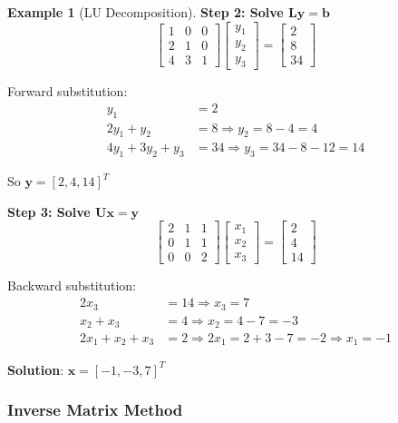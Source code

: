 \documentclass[12pt,a4paper]{article}
\theoremstyle{definition}
\newtheorem{example}{Example}[section]
\begin{document}
\begin{example}[LU Decomposition]
\textbf{Step 2: Solve $\mathbf{Ly} = \mathbf{b}$}
\[
\begin{bmatrix}
1 & 0 & 0 \\
2 & 1 & 0 \\
4 & 3 & 1
\end{bmatrix}
\begin{bmatrix}
y_1 \\ y_2 \\ y_3
\end{bmatrix}
= \begin{bmatrix}
2 \\ 8 \\ 34
\end{bmatrix}
\]

Forward substitution:
\begin{align*}
y_1 &= 2 \\
2y_1 + y_2 &= 8 \Rightarrow y_2 = 8 - 4 = 4 \\
4y_1 + 3y_2 + y_3 &= 34 \Rightarrow y_3 = 34 - 8 - 12 = 14
\end{align*}

So $\mathbf{y} = [2, 4, 14]^T$

\textbf{Step 3: Solve $\mathbf{Ux} = \mathbf{y}$}
\[
\begin{bmatrix}
2 & 1 & 1 \\
0 & 1 & 1 \\
0 & 0 & 2
\end{bmatrix}
\begin{bmatrix}
x_1 \\ x_2 \\ x_3
\end{bmatrix}
= \begin{bmatrix}
2 \\ 4 \\ 14
\end{bmatrix}
\]

Backward substitution:
\begin{align*}
2x_3 &= 14 \Rightarrow x_3 = 7 \\
x_2 + x_3 &= 4 \Rightarrow x_2 = 4 - 7 = -3 \\
2x_1 + x_2 + x_3 &= 2 \Rightarrow 2x_1 = 2 + 3 - 7 = -2 \Rightarrow x_1 = -1
\end{align*}

\textbf{Solution}: $\mathbf{x} = [-1, -3, 7]^T$
\end{example}

\subsubsection{Inverse Matrix Method}
\end{document}
